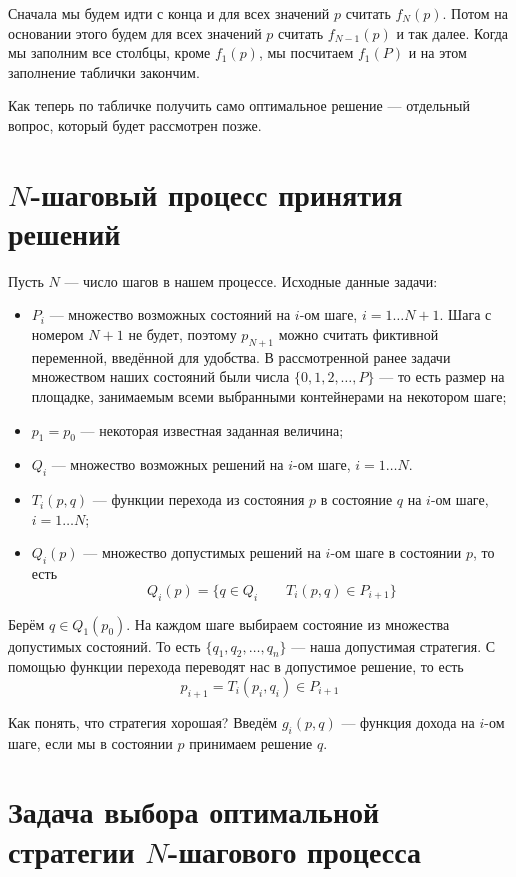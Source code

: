 Сначала мы будем идти с конца и для всех значений $p$ считать $f_N(p)$. Потом на основании этого будем для всех значений $p$ считать $f_{N-1}(p)$ и так далее. Когда мы заполним все столбцы, кроме $f_1(p)$, мы посчитаем $f_1(P)$ и на этом заполнение таблички закончим.

Как теперь по табличке получить само оптимальное решение --- отдельный вопрос, который будет рассмотрен позже.

\section{$N$-шаговый процесс принятия решений}

Пусть $N$ --- число шагов в нашем процессе. Исходные данные задачи:
\begin{itemize}
	\item $P_i$ --- множество возможных состояний на $i$-ом шаге, $i = 1 \dots N+1$. Шага с номером $N+1$ не будет, поэтому $p_{N+1}$ можно считать фиктивной переменной, введённой для удобства. В рассмотренной ранее задачи множеством наших состояний были числа $\{0, 1, 2, \dots, P\}$ --- то есть размер на площадке, занимаемым всеми выбранными контейнерами на некотором шаге;
	
	\item $p_1 = p_0$ --- некоторая известная заданная величина;
	
	\item $Q_i$ --- множество возможных решений на $i$-ом шаге, $i = 1 \dots N$.
	
	\item $T_i(p, q)$ --- функции перехода из состояния $p$ в состояние $q$ на $i$-ом шаге, $i = 1 \dots N$;
	
	\item $Q_i(p)$ --- множество допустимых решений на $i$-ом шаге в состоянии $p$, то есть
	\[
	Q_i(p) = \{q \in Q_i \qquad T_i(p, q) \in P_{i+1}\}
	\]	
\end{itemize}

Берём $q \in Q_1(p_0)$. На каждом шаге выбираем состояние из множества допустимых состояний. То есть $\{q_1, q_2, \dots, q_n\}$ --- наша допустимая стратегия. С помощью функции перехода переводят нас в допустимое решение, то есть
\[
p_{i+1} = T_i(p_i, q_i) \in P_{i+1}
\]

Как понять, что стратегия хорошая? Введём $g_i(p, q)$ --- функция дохода на $i$-ом шаге, если мы в состоянии $p$ принимаем решение $q$.

\section{Задача выбора оптимальной стратегии $N$-шагового процесса}

